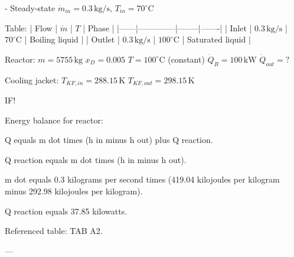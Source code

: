 - Steady-state  
\( \dot{m}_{in} = 0.3 \, \text{kg/s}, \, T_{in} = 70^\circ \text{C} \)  

Table:  
| Flow | \( \dot{m} \) | \( T \) | Phase |  
|------|--------------|--------|-------|  
| Inlet | \( 0.3 \, \text{kg/s} \) | \( 70^\circ \text{C} \) | Boiling liquid |  
| Outlet | \( 0.3 \, \text{kg/s} \) | \( 100^\circ \text{C} \) | Saturated liquid |  

Reactor:  
\( m = 5755 \, \text{kg} \)  
\( x_D = 0.005 \)  
\( T = 100^\circ \text{C} \) (constant)  
\( \dot{Q}_R = 100 \, \text{kW} \)  
\( \dot{Q}_{out} = ? \)  

Cooling jacket:  
\( T_{KF,in} = 288.15 \, \text{K} \)  
\( T_{KF,out} = 298.15 \, \text{K} \)  

IF!

Energy balance for reactor:  

Q equals m dot times (h in minus h out) plus Q reaction.  

Q reaction equals m dot times (h in minus h out).  

m dot equals 0.3 kilograms per second times (419.04 kilojoules per kilogram minus 292.98 kilojoules per kilogram).  

Q reaction equals 37.85 kilowatts.  

Referenced table: TAB A2.  

---